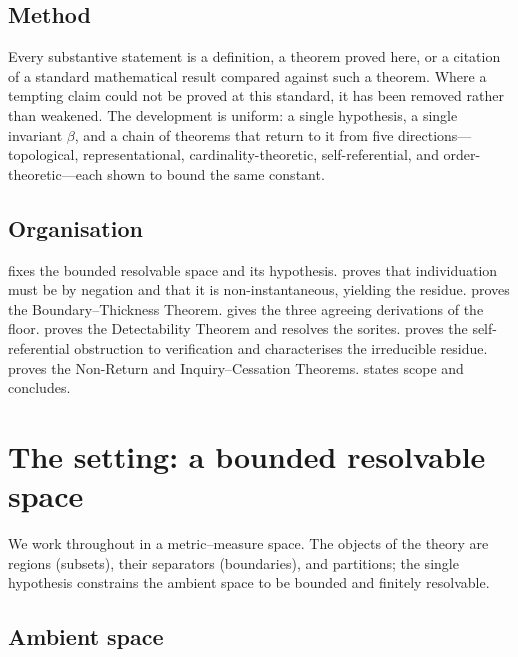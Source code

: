 \documentclass[11pt,a4paper]{article}
\theoremstyle{thmstyle}
\theoremstyle{definition}
\theoremstyle{remark}
\newcommand{\thick}{\beta}
\begin{document}
\subsection{Method}

Every substantive statement is a definition, a theorem proved here, or a
citation of a standard mathematical result compared against such a theorem.
Where a tempting claim could not be proved at this standard, it has been
removed rather than weakened. The development is uniform: a single hypothesis,
a single invariant $\thick$, and a chain of theorems that return to it from
five directions---topological, representational, cardinality-theoretic,
self-referential, and order-theoretic---each shown to bound the same constant.

\subsection{Organisation}

 fixes the bounded resolvable space and its hypothesis.
 proves that individuation must be by negation and that it
is non-instantaneous, yielding the residue.  proves the
Boundary--Thickness Theorem.  gives the three agreeing
derivations of the floor.  proves the Detectability Theorem
and resolves the sorites.  proves the self-referential
obstruction to verification and characterises the irreducible residue.
 proves the Non-Return and Inquiry--Cessation Theorems.
 states scope and concludes.


\section{The setting: a bounded resolvable space}
\label{sec:setting}

We work throughout in a metric--measure space. The objects of the theory are
regions (subsets), their separators (boundaries), and partitions; the single
hypothesis constrains the ambient space to be bounded and finitely resolvable.

\subsection{Ambient space}
\end{document}
